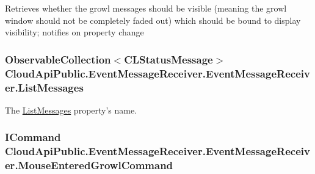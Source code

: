Retrieves whether the growl messages should be visible (meaning the growl window should not be completely faded out) which should be bound to display visibility; notifies on property change 

\hypertarget{class_cloud_api_public_1_1_event_message_receiver_1_1_event_message_receiver_a5499e363b5a8920bbbb70fe529dd6feb}{
\subsubsection[{List\-Messages}]{\setlength{\rightskip}{0pt plus 5cm}Observable\-Collection$<${\bf C\-L\-Status\-Message}$>$ Cloud\-Api\-Public.\-Event\-Message\-Receiver.\-Event\-Message\-Receiver.\-List\-Messages\hspace{0.3cm}{\ttfamily [get]}}}\label{class_cloud_api_public_1_1_event_message_receiver_1_1_event_message_receiver_a5499e363b5a8920bbbb70fe529dd6feb}


The \hyperlink{class_cloud_api_public_1_1_event_message_receiver_1_1_event_message_receiver_a5499e363b5a8920bbbb70fe529dd6feb}{List\-Messages} property's name. 

\hypertarget{class_cloud_api_public_1_1_event_message_receiver_1_1_event_message_receiver_a468875e6cf137136ec34e64e2ead14b9}{
\subsubsection[{Mouse\-Entered\-Growl\-Command}]{\setlength{\rightskip}{0pt plus 5cm}I\-Command Cloud\-Api\-Public.\-Event\-Message\-Receiver.\-Event\-Message\-Receiver.\-Mouse\-Entered\-Growl\-Command\hspace{0.3cm}{\ttfamily [get]}}}\label{class_cloud_api_public_1_1_event_message_receiver_1_1_event_message_receiver_a468875e6cf137136ec34e64e2ead14b9}


